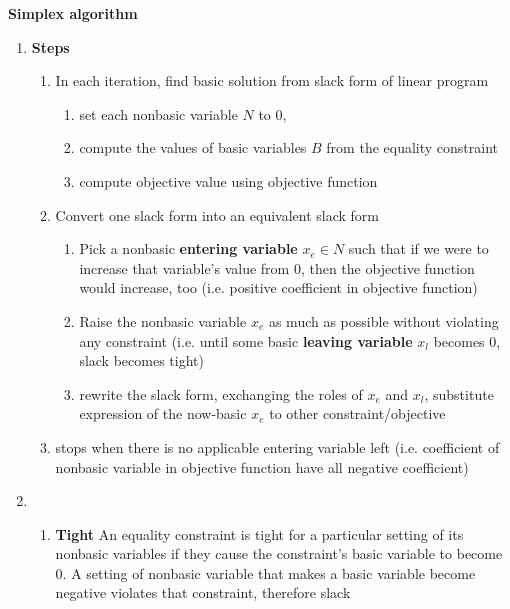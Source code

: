 \documentclass[11pt]{article}
\begin{document}
\begin{defn*}
    \textbf{Simplex algorithm}
    \begin{enumerate}
        \item \textbf{Steps}
        \begin{enumerate}
            \item In each iteration, find basic solution from slack form of linear program
            \begin{enumerate}
                \item set each nonbasic variable $N$ to 0,
                \item compute the values of basic variables $B$ from the equality constraint
                \item compute objective value using objective function 
            \end{enumerate} 
            \item Convert one slack form into an equivalent slack form 
            \begin{enumerate}
                \item Pick a nonbasic \textbf{entering variable} $x_e \in  N$ such that if we were to increase that variable's value from 0, then the objective function would increase, too (i.e. positive coefficient in objective function)
                \item Raise the nonbasic variable $x_e$ as much as possible without violating any constraint (i.e. until some basic \textbf{leaving variable} $x_l$ becomes 0, slack becomes tight) 
                \item rewrite the slack form, exchanging the roles of $x_e$ and $x_l$, substitute expression of the now-basic $x_e$ to other constraint/objective
            \end{enumerate}
            \item stops when there is no applicable entering variable left (i.e. coefficient of nonbasic variable in objective function have all negative coefficient)
        \end{enumerate}
        \item {} 
        \begin{enumerate}
            \item \textbf{Tight} An equality constraint is tight for a particular setting of its nonbasic variables if they cause the constraint's basic variable to become 0. A setting of nonbasic variable that makes a basic variable become negative violates that constraint, therefore slack 

\end{enumerate}
\end{enumerate}
\end{defn*}
\end{document}
